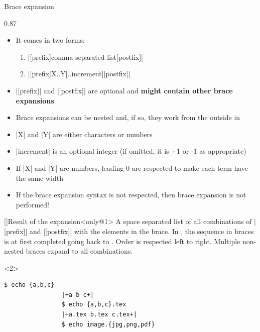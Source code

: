\begin{frame}[fragile]{Brace expansion}
    \vspace{-1mm}
    \begin{overlayarea}{\textwidth}{0.87\textheight}
        \begin{itemize}
            \item It comes in two forms:
                \begin{enumerate}
                    \item \bash|[prefix]{comma separated list}[postfix]|
                    \item \bash|[prefix]{X..Y[..increment]}[postfix]|
                \end{enumerate}
            \item<only@1> \bash|[prefix]| and \bash|[postfix]| are optional and \textbf{might contain other brace expansions}
            \item<only@1> Brace expansions can be nested and, if so, they work from the outside in
            \item<only@1> \bash|X| and \bash|Y| are either characters or numbers
            \item<only@1> \bash|increment| is an optional integer (if omitted, it is +1 or -1 as appropriate)
            \item<only@1> If \bash|X| and \bash|Y| are numbers, leading 0 are respected to make each term have the same width
            \item<only@1> If the brace expansion syntax is not respected, then brace expansion is not performed!
        \end{itemize}
        \begin{varblock}{}[\textwidth]{Result of the expansion}<only@1>
            A space separated list of all combinations of \bash|[prefix]| and \bash|[postfix]| with the elements in the brace.
            In , the sequence in braces is at first completed going back to .
            Order is respected left to right. Multiple non-nested braces expand to all combinations.
        \end{varblock}
        \begin{onlyenv}<2>
            \begin{lstlisting}[style=MyBash, style=oddnumbers, aboveskip=2mm]
                $ echo {a,b,c}
                |+a b c+|
                $ echo {a,b,c}.tex
                |+a.tex b.tex c.tex+|
                $ echo image.{jpg,png,pdf}

\end{lstlisting}
\end{onlyenv}
\end{overlayarea}
\end{frame}
